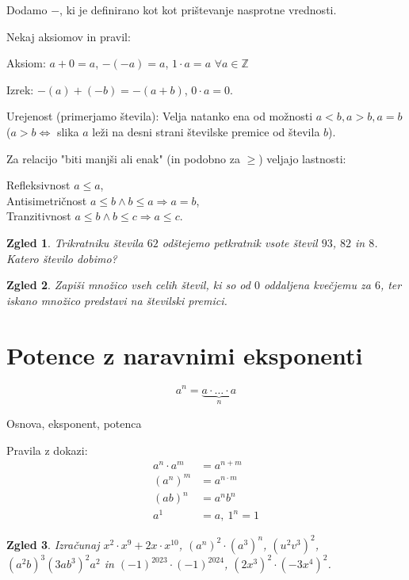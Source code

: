 \documentclass{article}
\newtheorem*{zgled}{Zgled}
\begin{document}
Dodamo $-$, ki je definirano kot kot prištevanje nasprotne vrednosti.

Nekaj aksiomov in pravil:

Aksiom: $a+0=a$, $-(-a)=a$, $1\cdot a =a$ $\forall a\in\mathbb{Z}$

Izrek: $-(a)+(-b)=-(a+b)$, $0\cdot a =0$.

Urejenost (primerjamo števila): Velja natanko ena od možnosti $a<b,a>b,a=b$ ($a>b\iff$ slika $a$ leži na desni strani številske premice od števila $b$).

Za relacijo "biti manjši ali enak" (in podobno za $\geq$) veljajo lastnosti:

Refleksivnost $a\leq a$,\\
Antisimetričnost $a\leq b \land b\leq a \Rightarrow a=b$,\\
Tranzitivnost $a\leq b \land b\leq c \Rightarrow a\leq c$.


\begin{zgled}
    Trikratniku števila $62$ odštejemo petkratnik vsote števil $93$, $82$ in $8$. Katero število dobimo?
\end{zgled}

\begin{zgled}
    Zapiši množico vseh celih števil, ki so od $0$ oddaljena kvečjemu za $6$, ter iskano množico predstavi na številski premici.
\end{zgled}

\section{Potence z naravnimi eksponenti}

\[a^n=\underbrace{a\cdot\ldots\cdot a}_{n}\]

Osnova, eksponent, potenca

Pravila z dokazi:
\begin{align*} 
a^n\cdot a^m &=a^{n+m}\\
\left(a^n\right)^m&=a^{n\cdot m}\\
\left(ab\right)^n&=a^n b^n\\
a^1&=a, \ 1^n = 1
\end{align*}

\begin{zgled}
    Izračunaj $x^2 \cdot x^9 +2x\cdot x^{10}$, $\left(a^n\right)^2\cdot\left(a^3 \right)^n$, $\left(u^2v^3\right)^2$, $\left(a^2b\right)^3\left(3ab^3\right)^2a^2$ in $(-1)^{2023}\cdot (-1)^{2024}$, $(2x^3)^2\cdot (-3x^4)^2$.
\end{zgled}
\end{document}
